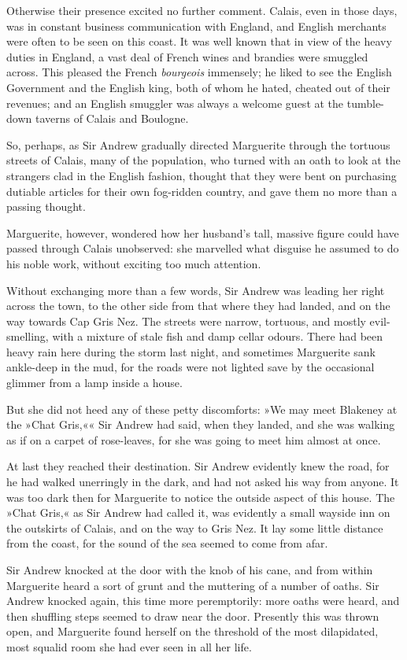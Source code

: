 Otherwise their presence excited no further comment. Calais, even in those days, was in constant business communication with England, and English merchants were often to be seen on this coast. It was well known that in view of the heavy duties in England, a vast deal of French wines and brandies were smuggled across. This pleased the French \textit{bourgeois} immensely; he liked to see the English Government and the English king, both of whom he hated, cheated out of their revenues; and an English smuggler was always a welcome guest at the tumble-down taverns of Calais and Boulogne.

So, perhaps, as Sir Andrew gradually directed Marguerite through the tortuous streets of Calais, many of the population, who turned with an oath to look at the strangers clad in the English fashion, thought that they were bent on purchasing dutiable articles for their own fog-ridden country, and gave them no more than a passing thought.

Marguerite, however, wondered how her husband's tall, massive figure could have passed through Calais unobserved: she marvelled what disguise he assumed to do his noble work, without exciting too much attention.

Without exchanging more than a few words, Sir Andrew was leading her right across the town, to the other side from that where they had landed, and on the way towards Cap Gris Nez. The streets were narrow, tortuous, and mostly evil-smelling, with a mixture of stale fish and damp cellar odours. There had been heavy rain here during the storm last night, and sometimes Marguerite sank ankle-deep in the mud, for the roads were not lighted save by the occasional glimmer from a lamp inside a house.

But she did not heed any of these petty discomforts: »We may meet Blakeney at the »Chat Gris,«« Sir Andrew had said, when they landed, and she was walking as if on a carpet of rose-leaves, for she was going to meet him almost at once.

At last they reached their destination. Sir Andrew evidently knew the road, for he had walked unerringly in the dark, and had not asked his way from anyone. It was too dark then for Marguerite to notice the outside aspect of this house. The »Chat Gris,« as Sir Andrew had called it, was evidently a small wayside inn on the outskirts of Calais, and on the way to Gris Nez. It lay some little distance from the coast, for the sound of the sea seemed to come from afar.

Sir Andrew knocked at the door with the knob of his cane, and from within Marguerite heard a sort of grunt and the muttering of a number of oaths. Sir Andrew knocked again, this time more peremptorily: more oaths were heard, and then shuffling steps seemed to draw near the door. Presently this was thrown open, and Marguerite found herself on the threshold of the most dilapidated, most squalid room she had ever seen in all her life.

